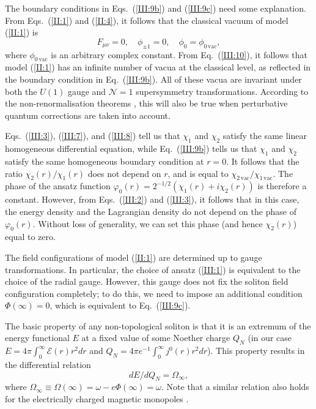 The boundary conditions  in  Eqs.~(\ref{III:9b})  and  (\ref{III:9c}) need some
explanation.
From Eqs.~(\ref{II:1}) and (\ref{II:4}),  it  follows that the classical vacuum
of model (\ref{II:1}) is
\begin{equation}
F_{\mu \nu} = 0,\quad
\phi_{\pm 1} = 0,\quad
\phi_{0} = \phi_{0\,\text{vac}},                                 \label{III:10}
\end{equation}
where $\phi _{0\,\text{vac}}$ is an arbitrary complex constant.
From Eq.~(\ref{III:10}), it  follows  that  model  (\ref{II:1}) has an infinite
number of vacua at the classical level,  as reflected in the boundary condition
in Eq.~(\ref{III:9b}).
All of these vacua are invariant  under  both the $U(1)$ gauge and $\mathcal{N}
= 1$ supersymmetry transformations.
According   to     the    non-renormalisation    theorems   \cite{gsr_npb_1979,
 seiberg_pl_1993}, this will also be true when perturbative quantum corrections
are taken into account.


Eqs.~(\ref{III:3}), (\ref{III:7}), and (\ref{III:8})  tell  us  that $\chi_{1}$
and $\chi_{2}$  satisfy  the  same  linear  homogeneous  differential equation,
while Eq.~(\ref{III:9b}) tells us  that  $\chi_{1}$  and $\chi_{2}$ satisfy the
same homogeneous boundary condition at $r = 0$.
It follows that the ratio $\chi_{2}(r)/\chi_{1}(r)$ does not depend on $r$, and
is equal to $\chi_{2\,\text{vac}}/\chi_{1\,\text{vac}}$.
The phase of the ansatz function $\varphi_{0}(r)=2^{-1/2}(\chi_{1}(r)+i\chi_{2}
(r))$ is therefore a constant.
However, from  Eqs.~(\ref{III:2})  and  (\ref{III:3}),  it follows that in this
case, the energy density and  the  Lagrangian  density  do  not  depend  on the
phase of $\varphi_{0}\left(r\right)$.
Without loss  of  generality,  we  can set this phase (and hence $\chi_{2}(r)$)
equal to zero.


The field  configurations  of  model  (\ref{II:1})  are  determined up to gauge
transformations.
In particular, the choice  of  ansatz (\ref{III:1}) is equivalent to the choice
of the radial gauge.
However, this gauge  does  not  fix the soliton field configuration completely;
to do this, we need to impose an additional condition $\Phi(\infty) = 0$, which
is equivalent to Eq.~(\ref{III:9c}).


The basic property of any non-topological  soliton is that it is an extremum of
the energy functional $E$  at  a fixed value of some Noether charge $Q_{N}$ (in
our case $E=4\pi \int\nolimits_{0}^{\infty }\mathcal{E}(r)r^{2}dr$ and $Q_{N}=4
\pi e^{-1}\int\nolimits_{0}^{\infty }j^{0}(r)r^{2}dr$).
This property results in the differential relation
\begin{equation}
dE/dQ_{N} = \Omega_{\infty},                                     \label{III:11}
\end{equation}
where $\Omega_{\infty} \equiv \Omega(\infty) = \omega - e \Phi(\infty)=\omega$.
Note that a similar relation  also holds for the electrically charged magnetic
monopoles \cite{loginov_plb_822}.


